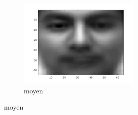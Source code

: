 \documentclass[a4paper]{article}
\begin{document}
\begin{figure}[H]
    \centering
     
    \begin{subfigure}[c]{0.24\textwidth}
        \centering
        \includegraphics[width=0.65\textwidth]{images/ex1_x_centre.png}
        \caption{moyen}
        \label{subfig:ex2_x_centre}
    \end{subfigure}


\end{figure}
\end{document}
